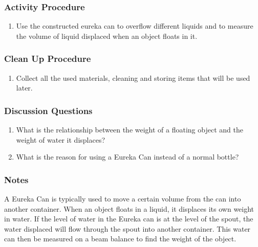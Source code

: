 \subsubsection*{Activity Procedure}
\begin{enumerate}
\item{Use the constructed eureka can to overflow different liquids and to measure the volume of liquid displaced when an object floats in it.} 
\end{enumerate}

\subsubsection*{Clean Up Procedure}
\begin{enumerate}
\item{Collect all the used materials, cleaning and storing items that will be used later.} 
\end{enumerate}

\subsubsection*{Discussion Questions}
\begin{enumerate}
\item{What is the relationship between the weight of a floating object and the weight of water it displaces?}
\item{What is the reason for using a Eureka Can instead of a normal bottle?}
\end{enumerate}

\subsubsection*{Notes}
A Eureka Can is typically used to move a certain volume from the can into another container.  When an object floats in a liquid, it displaces its own weight in water.  If the level of water in the Eureka can is at the level of the spout, the water displaced will flow through the spout into another container.  This water can then be measured on a beam balance to find the weight of the object.

